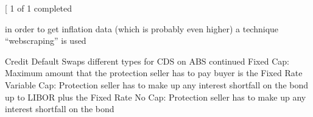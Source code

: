 \documentclass[letterpaper,10pt,english]{sphinxmanual}
\begin{document}
\begin{sphinxVerbatim}[commandchars=\\\{\}]
\end{sphinxVerbatim}

\noindent{}

\sphinxAtStartPar
{}
\begin{sphinxalltt}
{[}\sphinxstylestrong{*******************100\%*********************}{]}  1 of 1 completed
\end{sphinxalltt}

\begin{sphinxVerbatim}[commandchars=\\\{\}]
\end{sphinxVerbatim}

\noindent{}

\sphinxAtStartPar
in order to get inflation data (which is probably even higher) a
technique “webscraping” is used

\begin{sphinxVerbatim}[commandchars=\\\{\}]
 \PYG{p}{[}\PYG{p}{]}
\end{sphinxVerbatim}

\sphinxAtStartPar
Credit Default Swaps \textendash{} different types for CDS on ABS \sphinxhyphen{} continued \sphinxhyphen{}
Fixed Cap: Maximum amount that the protection seller has to pay buyer is
the Fixed Rate \sphinxhyphen{} Variable Cap: Protection seller has to make up any
interest shortfall on the bond up to LIBOR plus the Fixed Rate \sphinxhyphen{} No Cap:
Protection seller has to make up any interest shortfall on the bond

\sphinxAtStartPar
{}



\renewcommand{\indexname}{Index}
\printindex
\end{document}
